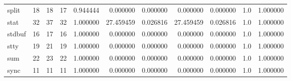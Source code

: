 \begin{tabular}{lrrrrrrrrrr}
split     &                                      18 &                 18 &                                17 &                                   0.944444 &                               0.000000 &                                     0.000000 &                          0.000000 &                                0.000000 &                                1.0 &                                           1.000000 \\
stat      &                                      32 &                 37 &                                32 &                                   1.000000 &                              27.459459 &                                     0.026816 &                         27.459459 &                                0.026816 &                                1.0 &                                           1.000000 \\
stdbuf    &                                      16 &                 17 &                                16 &                                   1.000000 &                               0.000000 &                                     0.000000 &                          0.000000 &                                0.000000 &                                1.0 &                                           1.000000 \\
stty      &                                      19 &                 21 &                                19 &                                   1.000000 &                               0.000000 &                                     0.000000 &                          0.000000 &                                0.000000 &                                1.0 &                                           1.000000 \\
sum       &                                      22 &                 23 &                                22 &                                   1.000000 &                               0.000000 &                                     0.000000 &                          0.000000 &                                0.000000 &                                1.0 &                                           1.000000 \\
sync      &                                      11 &                 11 &                                11 &                                   1.000000 &                               0.000000 &                                     0.000000 &                          0.000000 &                                0.000000 &                                1.0 &                                           1.000000 \\

\end{tabular}
